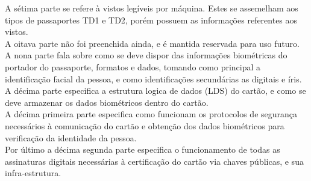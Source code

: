 \documentclass{article}
\begin{document}
\begin{justify}
				\hspace*{2cm} A sétima parte se refere à vistos legíveis por máquina. Estes se assemelham aos tipos de passaportes TD1 e TD2, porém possuem as informações referentes aos vistos.\\
				\hspace*{2cm} A oitava parte não foi preenchida ainda, e é mantida reservada para uso futuro.\\
				\hspace*{2cm} A nona parte fala sobre como se deve dispor das informações biométricas do portador do passaporte, formatos e dados, tomando como principal a identificação facial da pessoa, e como identificações secundárias as digitais e íris.\\
				\hspace*{2cm} A décima parte especifica a estrutura logica de dados (LDS) do cartão, e como se deve armazenar os dados biométricos dentro do cartão.\\
				\hspace*{2cm} A décima primeira parte especifica como funcionam os protocolos de segurança necessários à comunicação do cartão e obtenção dos dados biométricos para verificação da identidade da pessoa.\\
				\hspace*{2cm} Por último a décima segunda parte especifica o funcionamento de todas as assinaturas digitais necessárias à certificação do cartão via chaves públicas, e sua infra-estrutura.\\

		\end{justify}
\end{document}

